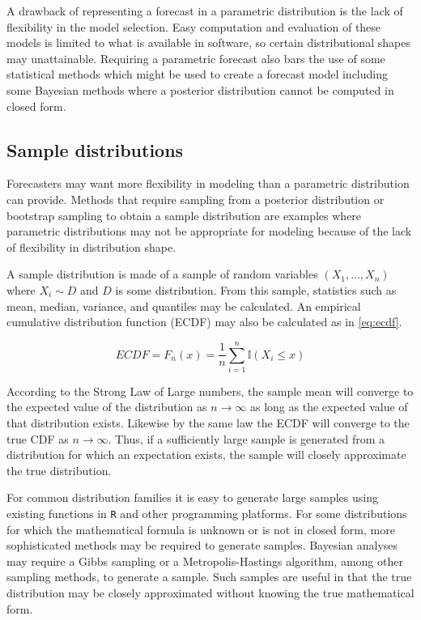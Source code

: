 \documentclass[11pt,notitlepage]{isuthesis}
\begin{document}
A drawback of representing a forecast in a parametric distribution is the lack 
of flexibility in the model selection. Easy computation and evaluation of these 
models is limited to what is available in software, so certain distributional
shapes may unattainable.
Requiring a parametric forecast also bars the use of some statistical methods
which might be used to create a forecast model including some Bayesian methods
where a posterior distribution cannot be computed in closed form.


\subsection{Sample distributions}
Forecasters may want more flexibility in modeling than a 
parametric 
distribution can provide. Methods that require sampling from a posterior 
distribution or bootstrap sampling to obtain a sample distribution are examples
where parametric distributions may not be appropriate for modeling because of 
the lack of flexibility in distribution shape.

A sample distribution is made of a sample of random variables 
$(X_1,...,X_n)$ where $X_i \sim D$ and $D$ is some distribution. From this 
sample,
statistics such as mean, median, variance, and quantiles may be calculated. 
An empirical cumulative distribution function (ECDF) may also be calculated as
in \eqref{eq:ecdf}.

\begin{equation}
\label{eq:ecdf}
  ECDF = F_n(x) = \frac{1}{n} \sum_{i=1}^n \mathbb{I}(X_i \leq x)
\end{equation}

According to the Strong Law of Large numbers, the sample mean will converge to
the expected value of the distribution as $n \rightarrow \infty$ as long as the 
expected value of that distribution exists. Likewise by the same law the 
ECDF will converge to the true CDF 
as $n \rightarrow \infty$. Thus, if a sufficiently large 
sample is generated from a distribution for which an expectation exists, 
the sample will closely approximate the 
true distribution. 

For common distribution families it is easy to generate large samples using 
existing functions in \texttt{R} and other programming platforms. For some 
distributions 
for which the mathematical formula is unknown or is not in closed form, more 
sophisticated methods may be required to generate samples. Bayesian analyses may 
require a Gibbs sampling or a Metropolis-Hastings algorithm, among other
sampling methods, 
to generate a 
sample. Such samples are useful in that the true distribution may be closely 
approximated without knowing the true mathematical form. 
\end{document}
